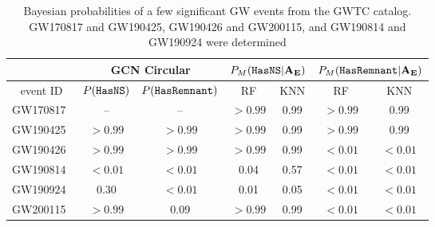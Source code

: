 \begin{table}[]
\begin{tabular}{c|cc|cc|cc}
\hline
\multicolumn{1}{c|}{}  &  \multicolumn{2}{c|}{GCN Circular}                                                & \multicolumn{2}{c|}{$P_M({{\tt HasNS}}|{\bf A}_{\bf E})$}                                                & \multicolumn{2}{c}{$P_M({{\tt HasRemnant}}|{\bf A}_{\bf E})$}                                                \\ \hline
\multicolumn{1}{c|}{event ID}  & \multicolumn{1}{c}{$P({{\tt HasNS}})$} & \multicolumn{1}{c}{$P({{\tt HasRemnant}})$}  & \multicolumn{1}{c}{RF} & \multicolumn{1}{c}{KNN}  & \multicolumn{1}{c}{RF} & \multicolumn{1}{c}{KNN} \\ \hline
GW170817~\cite{2017GCN.21509....1L}      &  -- &          --                  & $>0.99$                 & 0.99                    & $>0.99$                   & 0.99                                \\
GW190425~\cite{2019GCN.24168....1L}     & $>0.99$      & $>0.99$                        & $>0.99$                  & 0.99                    & $>0.99$                   & 0.99                          \\
GW190426~\cite{2019GCN.24237....1L}                               &     $>0.99$      & $>0.99$ & $>0.99$                   & 0.99                    & $< 0.01$             & $< 0.01$                    \\
GW190814~\cite{2019GCN.25324....1L}                                  &   $< 0.01$ & $<0.01$ & 0.04                   & 0.57                   & $< 0.01$              & $< 0.01$                      \\
GW190924~\cite{2019GCN.25829....1L}                                                          &   $0.30$ & $<0.01$ & 0.01                  & 0.05                   & $< 0.01$              & $< 0.01$                       \\               
GW200115~\cite{2020GCN.26759....1L}                                                         &     $>0.99$      & $0.09$ & $>0.99$                   & 0.99                   & $< 0.01$              & $< 0.01$                           \\
\hline
\end{tabular}
\caption{Bayesian probabilities of a few significant \ac{GW} events from the \ac{GWTC} catalog. GW170817 and GW190425, GW190426 and GW200115, and GW190814 and GW190924 were determined }
\label{tab:real_data_bayesian}
\end{table}


